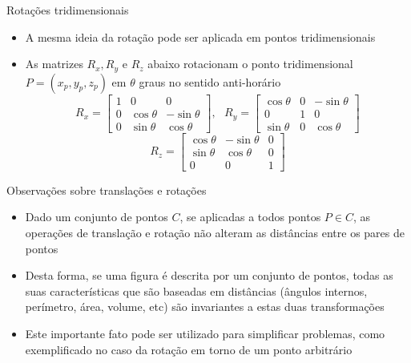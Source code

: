 \begin{frame}[fragile]{Rotações tridimensionais}

    \begin{itemize}
        \item A mesma ideia da rotação pode ser aplicada em pontos tridimensionais

        \item As matrizes $R_x, R_y$ e $R_z$ abaixo rotacionam o ponto tridimensional 
            $P = (x_p, y_p, z_p)$ em $\theta$ graus no sentido anti-horário
        \[
            R_x = \begin{bmatrix} 1 & 0 & 0 \\ 0 & \cos \theta & -\sin \theta \\
                0 & \sin \theta & \cos \theta \end{bmatrix}, \, \, \, \,
            R_y = \begin{bmatrix} \cos \theta & 0 & -\sin \theta \\ 0 & 1 & 0 \\
                \sin \theta & 0 & \cos \theta \end{bmatrix}
        \]
        \[
            R_z = \begin{bmatrix} \cos \theta & -\sin \theta & 0 \\
                \sin \theta & \cos \theta & 0 \\ 0 & 0 & 1\end{bmatrix}
        \]
    \end{itemize}

\end{frame}

\begin{frame}[fragile]{Observações sobre translações e rotações}

    \begin{itemize}
        \item Dado um conjunto de pontos $C$, se aplicadas a todos pontos $P\in C$, as operações de 
        translação e rotação não alteram as distâncias entre os pares de pontos

        \item Desta forma, se uma figura é descrita por um conjunto de pontos, todas as suas 
            características que são baseadas em distâncias (ângulos internos, perímetro, área, 
            volume, etc) são invariantes a estas duas transformações

        \item Este importante fato pode ser utilizado para simplificar problemas, 
            como exemplificado no caso da rotação em torno de um ponto arbitrário
    \end{itemize}

\end{frame}

